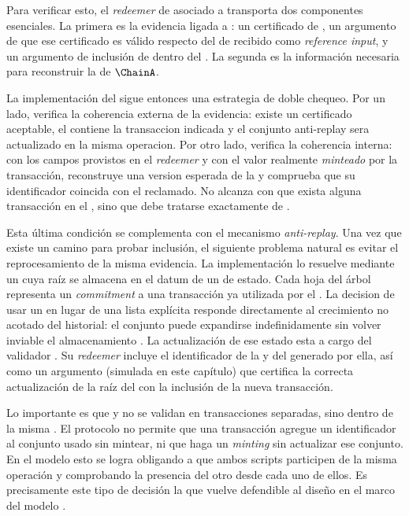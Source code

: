 Para verificar esto, el \textit{redeemer} de \MintTx asociado a \MintingValidator transporta dos componentes esenciales. La primera es la evidencia ligada a \Mithril: un certificado de \TransactionSnapshot, un argumento \ZK de que ese certificado es válido respecto del \UTxO de \StakeDistribution recibido como \textit{reference input}, y un argumento \ZK de inclusión de \LockTx dentro del \TransactionSnapshot. La segunda es la información necesaria para reconstruir la \LockTx de $\ChainA$.

La implementación del \MintingValidator sigue entonces una estrategia de doble chequeo. Por un lado, verifica la coherencia externa de la evidencia: existe un certificado aceptable, el \TransactionSnapshot contiene la transaccion indicada y el conjunto anti-replay sera actualizado en la misma operacion. Por otro lado, verifica la coherencia interna: con los campos provistos en el \textit{redeemer} y con el valor realmente \textit{minteado} por la transacción, reconstruye una version esperada de la \LockTx y comprueba que su identificador coincida con el reclamado. No alcanza con que exista alguna transacción en el \TransactionSnapshot, sino que debe tratarse exactamente de \LockTx.

Esta última condición se complementa con el mecanismo \textit{anti-replay}. Una vez que existe un camino para probar inclusión, el siguiente problema natural es evitar el reprocesamiento de la misma evidencia. La implementación lo resuelve mediante un \SMT cuya raíz se almacena en el datum de un \UTxO de estado. Cada hoja del árbol representa un \textit{commitment} a una transacción ya utilizada por el \zkBridge. La decision de usar un \SMT en lugar de una lista explícita responde directamente al crecimiento no acotado del historial: el conjunto puede expandirse indefinidamente sin volver inviable el almacenamiento \Onchain. La actualización de ese estado esta a cargo del validador \TxsUpdaterMintingValidator. Su \textit{redeemer} incluye el identificador de la \LockTx y del \UTxO generado por ella, así como un argumento \ZK \Groth (simulada en este capítulo) que certifica la correcta actualización de la raíz del \SMT con la inclusión de la nueva transacción.

Lo importante es que \MintingValidator y \TxsUpdaterMintingValidator no se validan en transacciones separadas, sino dentro de la misma \MintTx. El protocolo no permite que una transacción agregue un identificador al conjunto usado sin mintear, ni que haga un \textit{minting} sin actualizar ese conjunto. En el modelo \eUTxO esto se logra obligando a que ambos scripts participen de la misma operación y comprobando la presencia del otro desde cada uno de ellos. Es precisamente este tipo de decisión la que vuelve defendible al diseño en el marco del modelo \eUTxO.

